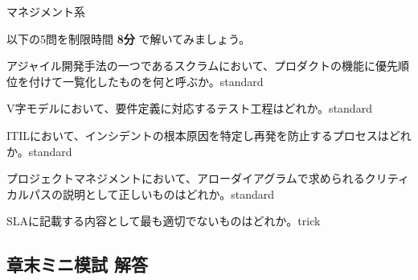 \begin{minimoshi}{マネジメント系}

以下の5問を制限時間 \textbf{8分} で解いてみましょう。

\begin{mondai}{アジャイル開発手法の一つであるスクラムにおいて、プロダクトの機能に優先順位を付けて一覧化したものを何と呼ぶか。}{standard}
\end{mondai}

\begin{mondai}{V字モデルにおいて、要件定義に対応するテスト工程はどれか。}{standard}
\end{mondai}

\begin{mondai}{ITILにおいて、インシデントの根本原因を特定し再発を防止するプロセスはどれか。}{standard}
\end{mondai}

\begin{mondai}{プロジェクトマネジメントにおいて、アローダイアグラムで求められるクリティカルパスの説明として正しいものはどれか。}{standard}
\end{mondai}

\begin{mondai}{SLAに記載する内容として最も適切でないものはどれか。}{trick}
\end{mondai}

\end{minimoshi}

\subsection*{章末ミニ模試 解答}


